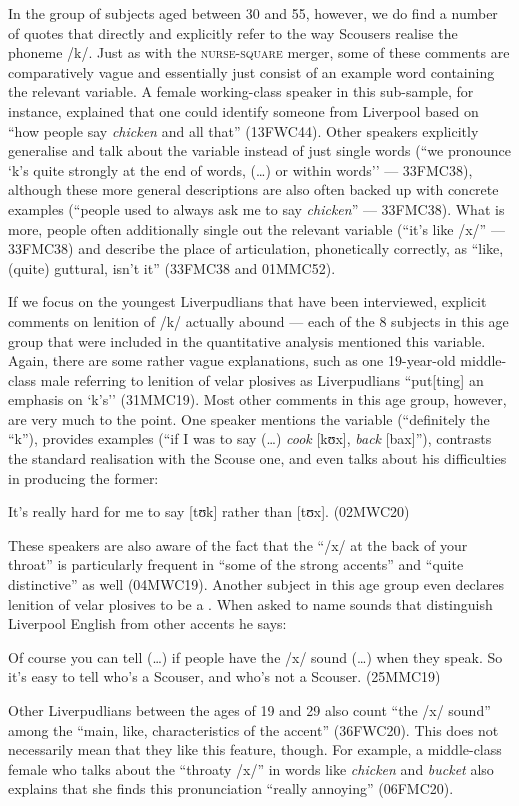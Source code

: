 In the group of subjects aged between 30 and 55, however, we do find a number of quotes that directly and explicitly refer to the way Scousers realise the phoneme /k/.
Just as with the \textsc{nurse}-\textsc{square} merger, some of these comments are comparatively vague and essentially just consist of an example word containing the relevant variable.
A female working-class speaker in this sub-sample, for instance, explained that one could identify someone from Liverpool based on ``how people say \emph{chicken} and all that'' (13FWC44).
Other speakers explicitly generalise and talk about the variable instead of just single words (``we pronounce `k's quite strongly at the end of words, (\ldots) or within words'' --- 33FMC38), although these more general descriptions are also often backed up with concrete examples (``people used to always ask me to say \emph{chicken}'' --- 33FMC38).
What is more, people often additionally single out the relevant variable (``it's like /x/'' --- 33FMC38) and describe the place of articulation, phonetically correctly, as ``like, (quite) guttural, isn't it'' (33FMC38 and 01MMC52).

If we focus on the youngest Liverpudlians that have been interviewed, explicit comments on lenition of /k/ actually abound --- each of the 8 subjects in this age group that were included in the quantitative analysis mentioned this variable.
Again, there are some rather vague explanations, such as one 19-year-old middle-class male referring to lenition of velar plosives as Liverpudlians ``put[ting] an emphasis on `k's'' (31MMC19).
Most other comments in this age group, however, are very much to the point.
One speaker mentions the variable (``definitely the ``k''), provides examples (``if I was to say (\ldots) \emph{cook} [kʊx], \emph{back} [bax]''), contrasts the standard realisation with the Scouse one, and even talks about his difficulties in producing the former: 
\begin{example}
	It's really hard for me to say [tʊk] rather than [tʊx]. (02MWC20)
\end{example}

These speakers are also aware of the fact that the ``/x/ at the back of your throat'' is particularly frequent in ``some of the strong accents'' and ``quite distinctive'' as well (04MWC19).
Another subject in this age group even declares lenition of velar plosives to be a .
When asked to name sounds that distinguish Liverpool English from other accents he says:
\begin{example}
	Of course you can tell (\ldots) if people have the /x/ sound (\ldots) when they speak.
	So it's easy to tell who's a Scouser, and who's not a Scouser. (25MMC19)
\end{example}
Other Liverpudlians between the ages of 19 and 29 also count ``the /x/ sound'' among the ``main, like, characteristics of the accent'' (36FWC20).
This does not necessarily mean that they like this feature, though.
For example, a middle-class female who talks about the ``throaty /x/'' in words like \emph{chicken} and \emph{bucket} also explains that she finds this pronunciation ``really annoying'' (06FMC20).

